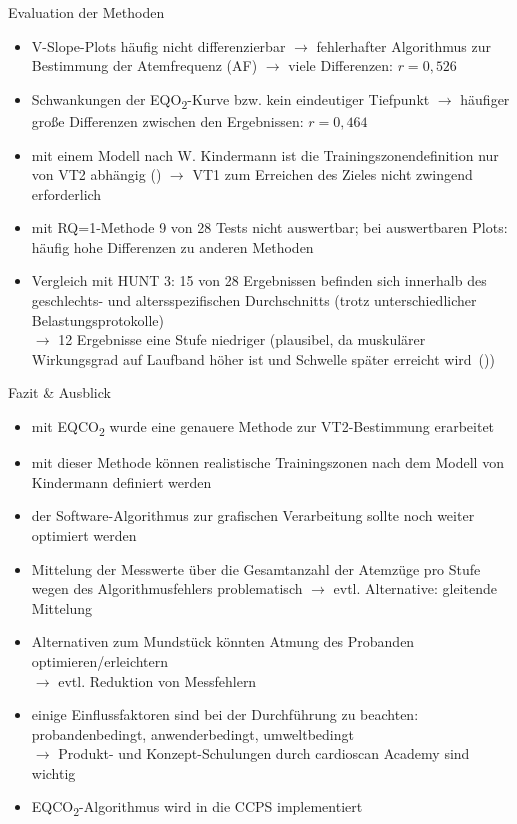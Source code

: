 \documentclass[colorBG,slideColor,8pt]{beamer}
\newcommand{\eqotwo}{EQO\textsubscript{2}}
\newcommand{\eqcotwo}{EQCO\textsubscript{2}}
\begin{document}
\begin{frame}{Evaluation der Methoden}
\begin{itemize}
	\item V-Slope-Plots häufig nicht differenzierbar $\rightarrow$ fehlerhafter Algorithmus zur Bestimmung der Atemfrequenz (AF) $\rightarrow$ viele Differenzen: $r = 0,526$
	\item Schwankungen der \eqotwo-Kurve bzw. kein eindeutiger Tiefpunkt $\rightarrow$ häufiger große Differenzen zwischen den Ergebnissen: $r = 0,464$
	\item mit einem Modell nach W. Kindermann ist die Trainingszonendefinition nur von VT2 abhängig (\cite{Kindermann.2004}) $\rightarrow$ VT1 zum Erreichen des Zieles nicht zwingend erforderlich
	\item mit RQ=1-Methode 9 von 28 Tests nicht auswertbar; bei auswertbaren Plots: häufig hohe Differenzen zu anderen Methoden
	\item Vergleich mit HUNT 3: 15 von 28 Ergebnissen befinden sich innerhalb des geschlechts- und altersspezifischen Durchschnitts (trotz unterschiedlicher Belastungsprotokolle)\\$\rightarrow$ 12 Ergebnisse eine Stufe niedriger (plausibel, da muskulärer Wirkungsgrad auf Laufband höher ist und Schwelle später erreicht wird~(\cite{Kroidl.2015}))
\end{itemize}
\end{frame}

\begin{frame}{Fazit \& Ausblick}
\begin{itemize}
	\item mit \eqcotwo{} wurde eine genauere Methode zur VT2-Bestimmung erarbeitet
	\item mit dieser Methode können realistische Trainingszonen nach dem Modell von Kindermann definiert werden
	\item der Software-Algorithmus zur grafischen Verarbeitung sollte noch weiter optimiert werden
	\item Mittelung der Messwerte über die Gesamtanzahl der Atemzüge pro Stufe wegen des Algorithmusfehlers problematisch $\rightarrow$ evtl. Alternative: gleitende Mittelung
	\item Alternativen zum Mundstück könnten Atmung des Probanden optimieren/erleichtern\\$\rightarrow$ evtl. Reduktion von Messfehlern
	\item einige Einflussfaktoren sind bei der Durchführung zu beachten: probandenbedingt, anwenderbedingt, umweltbedingt\\$\rightarrow$ Produkt- und Konzept-Schulungen durch cardioscan Academy sind wichtig
	\item \eqcotwo-Algorithmus wird in die CCPS implementiert
\end{itemize}
\end{frame}
\end{document}
